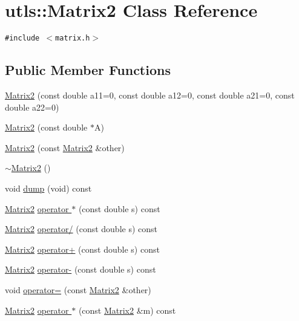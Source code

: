 \hypertarget{classutls_1_1Matrix2}{
\section{utls::Matrix2 Class Reference}
\label{classutls_1_1Matrix2}
}
{\tt \#include $<$matrix.h$>$}

\subsection*{Public Member Functions}
\begin{CompactItemize}
\item 
\hyperlink{classutls_1_1Matrix2_672d32b33a25b8f8ee2e430db994a94e}{Matrix2} (const double a11=0, const double a12=0, const double a21=0, const double a22=0)
\item 
\hyperlink{classutls_1_1Matrix2_3b81c157f31f6fba8e2145d326bc86ae}{Matrix2} (const double $\ast$A)
\item 
\hyperlink{classutls_1_1Matrix2_ef457753ff407d0a374c2d82cd60c40d}{Matrix2} (const \hyperlink{classutls_1_1Matrix2}{Matrix2} \&other)
\item 
\hyperlink{classutls_1_1Matrix2_76ca5ea4f2c561c7c5e1b734b0585b3f}{$\sim$Matrix2} ()
\item 
void \hyperlink{classutls_1_1Matrix2_a69a2a530e756a36312fd2fa102bdcd3}{dump} (void) const 
\item 
\hyperlink{classutls_1_1Matrix2}{Matrix2} \hyperlink{classutls_1_1Matrix2_ee01e0dc39782f92f955b33cbcdb77aa}{operator $\ast$} (const double s) const 
\item 
\hyperlink{classutls_1_1Matrix2}{Matrix2} \hyperlink{classutls_1_1Matrix2_d937e6eeb0243c1760e65c63bedd00e0}{operator/} (const double s) const 
\item 
\hyperlink{classutls_1_1Matrix2}{Matrix2} \hyperlink{classutls_1_1Matrix2_bea714bdf616c0b90db7f91a4f3147f8}{operator+} (const double s) const 
\item 
\hyperlink{classutls_1_1Matrix2}{Matrix2} \hyperlink{classutls_1_1Matrix2_3de00b53dd1dfabde9d8fb2b4c05dfa0}{operator-} (const double s) const 
\item 
void \hyperlink{classutls_1_1Matrix2_991cee2128c379df897fed56d76ce5c1}{operator=} (const \hyperlink{classutls_1_1Matrix2}{Matrix2} \&other)
\item 
\hyperlink{classutls_1_1Matrix2}{Matrix2} \hyperlink{classutls_1_1Matrix2_52a4fa4aa57879987d7e85f16235c451}{operator $\ast$} (const \hyperlink{classutls_1_1Matrix2}{Matrix2} \&m) const 

\end{CompactItemize}
